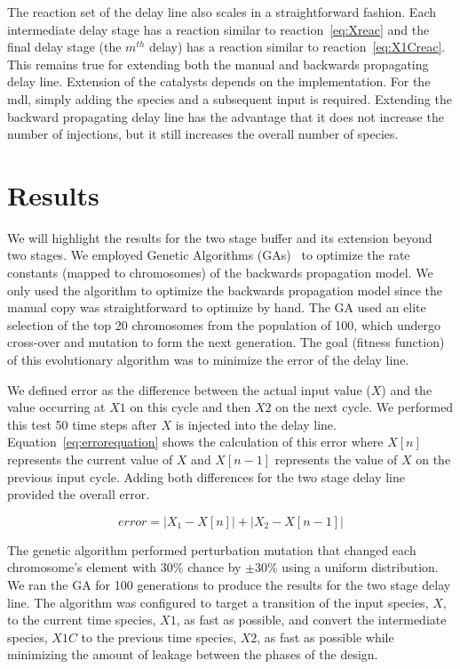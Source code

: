 The reaction set of the delay line also scales in a straightforward fashion. Each intermediate delay stage has a reaction similar to reaction~\ref{eq:Xreac} and the final delay stage (the $m^{th}$ delay) has a reaction similar to reaction~\ref{eq:X1Creac}. This remains true for extending both the manual and backwards propagating delay line. Extension of the catalysts depends on the implementation. For the \gls{mdl}, simply adding the species and a subsequent input is required. Extending the backward propagating delay line has the advantage that it does not increase the number of injections, but it still increases the overall number of species.

\section{Results}
\label{sec:dl_results}
We will highlight the results for the two stage buffer and its extension beyond two stages. We employed Genetic Algorithms (GAs)~\cite{Mitchell1998-tw} to optimize the rate constants (mapped to chromosomes) of the backwards propagation model. We only used the algorithm to optimize the backwards propagation model since the manual copy was straightforward to optimize by hand. The GA used an elite selection of the top 20 chromosomes from the population of 100, which undergo cross-over and mutation to form the next generation. The goal (fitness function) of this evolutionary algorithm was to minimize the error of the delay line.

We defined error as the difference between the actual input value ($X$) and the value occurring at $X1$ on this cycle and then $X2$ on the next cycle. We performed this test 50 time steps after $X$ is injected into the delay line. Equation~\ref{eq:errorequation} shows the calculation of this error where $X[n]$ represents the current value of $X$ and $X[n-1]$ represents the value of $X$ on the previous input cycle. Adding both differences for the two stage delay line provided the overall error.

\begin{equation}
error = |X_1 - X[n]| + |X_2 - X[n-1]| \label{eq:errorequation}
\end{equation}

The genetic algorithm performed perturbation mutation that changed each chromosome's element with 30\% chance by $\pm$30\% using a uniform distribution. We ran the GA for 100 generations to produce the results for the two stage delay line. The algorithm was configured to target a transition of the input species, $X$, to the current time species, $X1$, as fast as possible, and convert the intermediate species, $X1C$ to the previous time species, $X2$, as fast as possible while minimizing the amount of leakage between the phases of the design.

